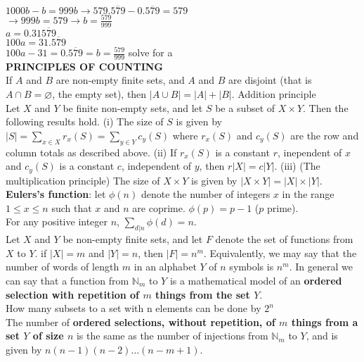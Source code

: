 \documentclass[10pt,landscape]{article}
\begin{document}
\begin{multicols}{4}
$1000b-b=999b \rightarrow 579.\overline{579}-0.\overline{579}=579$\\

$\rightarrow 999b=579 \rightarrow b=\frac{579}{999}$\\
$a=0.31\overline{579}$\\
$100a=31.\overline{579}$\\
$100a-31=0.\overline{579}=b=\frac{579}{999}$ solve for a\\

\textbf{PRINCIPLES OF COUNTING}\\

If $A$ and $B$ are non-empty finite sets, and $A$ and $B$ are disjoint
(that is $A \cap B = \varnothing$, the empty set), then $|A \cup B| =
|A| + |B|$. Addition principle\\

Let $X$ and $Y$ be finite non-empty sets, and let $S$ be a subset of
$X \times Y$. Then the following results hold.
(i) The size of $S$ is given by $|S| = \displaystyle\sum_{x \in X} r_{x}(S) =
\displaystyle\sum_{y \in Y} c_{y}(S)$ where $r_{x}(S)$ and $c_{y}(S)$
are the row and column totals as described above.
(ii) If $r_{x}(S)$ is a constant $r$, inependent of $x$ and $c_{y}(S)$
is a constant $c$, independent of $y$, then $r|X| = c|Y|$.
(iii) (The multiplication principle) The size of $X \times Y$ is given
by $|X \times Y| = |X| \times |Y|$.\\

\textbf{Eulers's function}: let $\phi(n)$ denote the number of
integers $x$ in the range $1 \leq x \leq n$ such that $x$ and $n$ are
coprime. $\phi(p) = p-1$ ($p$ prime).\\

For any positive integer $n$, $\displaystyle\sum_{d|n} \phi(d)=n$.\\

Let $X$ and $Y$ be non-empty finite sets, and let $F$ denote the set
of functions from $X$ to $Y$. if $|X| = m$ and $|Y| = n$, then $|F| =
n^{m}$. Equivalently, we may say that the number of words of length
$m$ in an alphabet $Y$ of $n$ symbols is $n^{m}$. In general we can
say that a function from $\mathbb{N}_{m}$ to $Y$ is a mathematical
model of an \textbf{ordered selection with repetition of $m$ things
  from the set $Y$}.\\

How many subsets to a set with n elements can be done by $2^{n}$\\


The number of \textbf{ordered selections, without repetition, of $m$ things
from a set $Y$ of size $n$} is the same as the number of injections
from $\mathbb{N}_{m}$ to $Y$, and is given by
$n(n-1)(n-2)\dots(n-m+1)$.\\


\end{multicols}
\end{document}
